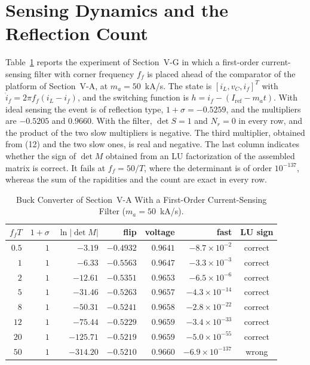 \documentclass[journal]{IEEEtran}
\begin{document}
\section{Sensing Dynamics and the Reflection Count}
Table~\ref{tab:sensado} reports the experiment of Section~V-G in which a
first-order current-sensing filter with corner frequency $f_f$ is placed
ahead of the comparator of the platform of Section~V-A, at $m_a=50$~kA/s.
The state is $[i_L,v_C,i_f]^{T}$ with $\dot i_f=2\pi f_f(i_L-i_f)$, and the
switching function is $h=i_f-(I_{\mathrm{ref}}-m_at)$. With ideal sensing
the event is of reflection type, $1+\sigma=-0.5259$, and the multipliers are
$-0.5205$ and $0.9660$. With the filter, $\det S=1$ and $N_r=0$ in every
row, and the product of the two slow multipliers is negative. The third
multiplier, obtained from (12) and the two slow ones, is real and negative.
The last column indicates whether the sign of $\det M$ obtained from an LU
factorization of the assembled matrix is correct. It fails at
$f_f=50/T$, where the determinant is of order $10^{-137}$, whereas the sum
of the rapidities and the count are exact in every row.

\begin{table}[!h]
\caption{Buck Converter of Section~V-A With a First-Order Current-Sensing
Filter ($m_a=50$~kA/s).}
\label{tab:sensado}
\centering
\footnotesize
\setlength{\tabcolsep}{3pt}
\begin{tabular}{@{}rrrrrrc@{}}
\toprule
$f_fT$ & $1+\sigma$ & $\ln\lvert\det M\rvert$ & flip & voltage & fast & LU sign \\
\midrule
$0.5$ & $1$ & $-3.19$ & $-0.4932$ & $0.9641$ & $-8.7\times10^{-2}$ & correct \\
$1$ & $1$ & $-6.33$ & $-0.5563$ & $0.9647$ & $-3.3\times10^{-3}$ & correct \\
$2$ & $1$ & $-12.61$ & $-0.5351$ & $0.9653$ & $-6.5\times10^{-6}$ & correct \\
$5$ & $1$ & $-31.46$ & $-0.5263$ & $0.9657$ & $-4.3\times10^{-14}$ & correct \\
$8$ & $1$ & $-50.31$ & $-0.5241$ & $0.9658$ & $-2.8\times10^{-22}$ & correct \\
$12$ & $1$ & $-75.44$ & $-0.5229$ & $0.9659$ & $-3.4\times10^{-33}$ & correct \\
$20$ & $1$ & $-125.71$ & $-0.5219$ & $0.9659$ & $-5.0\times10^{-55}$ & correct \\
$50$ & $1$ & $-314.20$ & $-0.5210$ & $0.9660$ & $-6.9\times10^{-137}$ & wrong \\
\bottomrule
\end{tabular}
\end{table}
\end{document}
